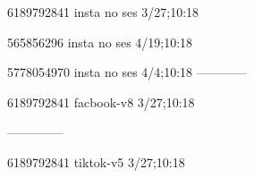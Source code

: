 6189792841 insta no ses
3/27;10:18

565856296 insta no ses
4/19;10:18

5778054970 insta no ses
4/4;10:18
------------

6189792841 facbook-v8
3/27;10:18


--------------

6189792841 tiktok-v5
3/27;10:18
